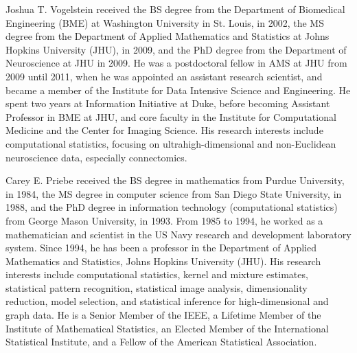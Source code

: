 \documentclass[10pt,journal,compsoc]{IEEEtran}
\begin{document}
\begin{IEEEbiography}{Joshua T. Vogelstein}
	received the BS degree from the Department of Biomedical Engineering
	(BME) at Washington University in St. Louis, in 2002, the MS degree from the Department of Applied Mathematics and Statistics at Johns Hopkins University (JHU), in 2009, and the PhD degree from the Department of Neuroscience at JHU in 2009. He was a postdoctoral fellow in AMS at JHU from 2009 until 2011, when he was appointed an assistant research scientist, and became a member of the Institute for Data Intensive Science and Engineering. He spent two years at Information Initiative at Duke, before becoming Assistant Professor in BME at JHU, and core faculty in the Institute for Computational Medicine and the Center for Imaging Science. His research interests include computational statistics, focusing on ultrahigh-dimensional and non-Euclidean neuroscience data, especially connectomics.
\end{IEEEbiography}

\begin{IEEEbiography}{Carey E. Priebe}
	received the BS degree in mathematics from Purdue University, in 1984, the MS degree in computer science from San Diego State University, in 1988, and the PhD 	degree in information technology (computational	statistics) from George Mason University, in 1993. From 1985 to 1994, he worked as a mathematician and scientist in the US Navy research and development laboratory system. Since 1994, he has been a professor in the Department of Applied Mathematics and Statistics, Johns Hopkins University (JHU). His research interests include computational statistics, kernel and mixture estimates, statistical pattern recognition, statistical image analysis, dimensionality reduction, model selection, and statistical inference for high-dimensional and graph data. He is a Senior Member of the IEEE, a Lifetime Member of the Institute of Mathematical Statistics, an Elected Member of the International Statistical Institute, and a Fellow of the American Statistical Association.
\end{IEEEbiography}

% 

\end{document}
